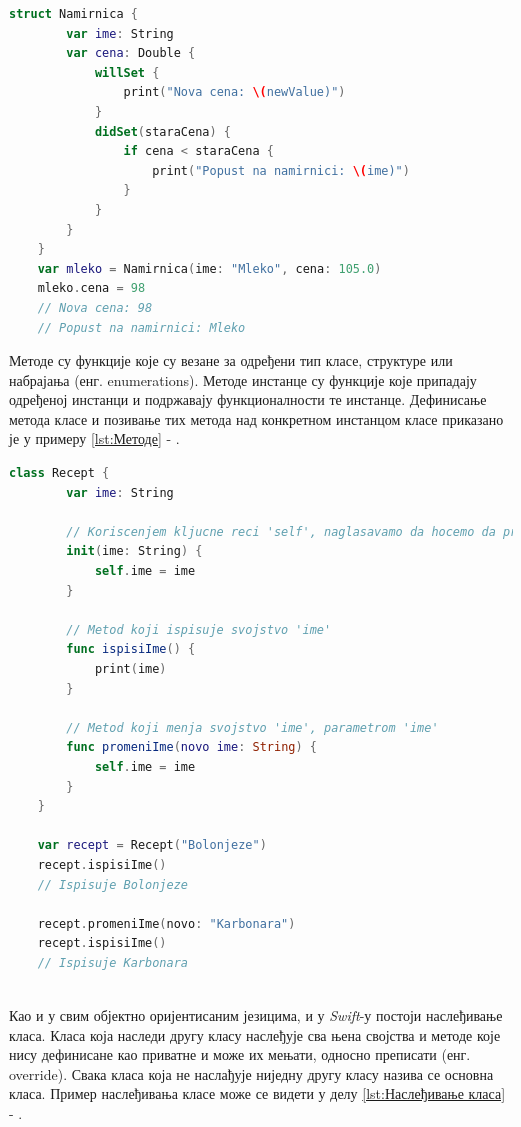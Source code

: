 \documentclass[12pt,oneside]{memoir}
\begin{document}
\begin{lstlisting}[caption=\textit{{Посматрачи својства}}, label={lst:Посматрачи својства}, language=Swift, frame=single]
    struct Namirnica {
        var ime: String
        var cena: Double {
            willSet {
                print("Nova cena: \(newValue)")
            }
            didSet(staraCena) {
                if cena < staraCena {
                    print("Popust na namirnici: \(ime)")
                }
            }
        }
    }
    var mleko = Namirnica(ime: "Mleko", cena: 105.0)
    mleko.cena = 98
    // Nova cena: 98
    // Popust na namirnici: Mleko
\end{lstlisting}

\indent Методе су функције које су везане за одређени тип класе, структуре или набрајања (енг. enumerations). Методе инстанце су функције које припадају одређеној инстанци и подржавају функционалности те инстанце. Дефинисање метода класе и позивање тих метода над конкретном инстанцом класе приказано је у примеру \ref{lst:Методе} - .

\begin{lstlisting}[caption=\textit{{Методе}}, label={lst:Методе}, language=Swift, frame=single]
    class Recept {
        var ime: String
        
        // Koriscenjem kljucne reci 'self', naglasavamo da hocemo da pristupimo svojstvu klase
        init(ime: String) {
            self.ime = ime
        }
        
        // Metod koji ispisuje svojstvo 'ime'
        func ispisiIme() {
            print(ime)
        }
        
        // Metod koji menja svojstvo 'ime', parametrom 'ime'
        func promeniIme(novo ime: String) {
            self.ime = ime
        }
    }
    
    var recept = Recept("Bolonjeze")
    recept.ispisiIme()
    // Ispisuje Bolonjeze
    
    recept.promeniIme(novo: "Karbonara")
    recept.ispisiIme()
    // Ispisuje Karbonara
    
\end{lstlisting}

\indent Као и у свим објектно оријентисаним језицима, и у \textit{Swift}-у постоји наслеђивање класа. Класа која наследи другу класу наслеђује сва њена својства и методе које нису дефинисане као приватне и може их мењати, односно преписати (енг. override). Свака класа која не наслађује ниједну другу класу назива се основна класа. Пример наслеђивања класе може се видети у делу \ref{lst:Наслеђивање класа} - .
\end{document}
